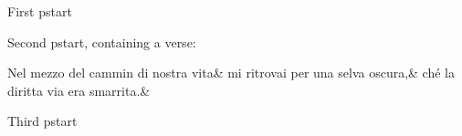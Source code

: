 \documentclass[11pt,a4paper]{book}
\begin{document}
\beginnumbering
\numberpstarttrue

\pstart%
First pstart
\pend

\pstart
Second pstart, containing a verse:
\pend

\numberpstartfalse
{}
\stanza
Nel mezzo del cammin di nostra vita&
mi ritrovai per una selva oscura,&
ché la diritta via era smarrita.\&

\numberpstarttrue
\pstart
Third pstart
\pend

\numberpstartfalse
\endnumbering
\end{document}
